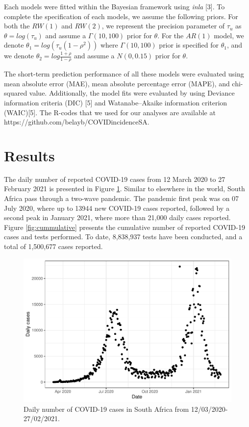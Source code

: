 \documentclass[10pt,letterpaper]{article}
\begin{document}
Each models were fitted within the Bayesian framework using
\emph{inla} {[}3{]}. To complete the specification of each models, we
assume the following priors. For both the \(RW(1)\) and \(RW(2)\), we represent the precision parameter of
\(\tau_u\) as \(\theta=log(\tau_u)\) and assume a
\(\Gamma (10,100)\) prior for \(\theta\).  For the \(AR(1)\) model, we denote
\(\theta_1=log(\tau_u(1-\rho^2))\) where \(\Gamma(10,100)\) prior is
specified for \(\theta_1\), and we denote
\(\theta_2=log\frac{1+\rho}{1-\rho}\) and assume a \(N(0, 0.15)\) prior
for \(\theta\). 

The short-term prediction performance of all these models were evaluated using mean absolute error (MAE), mean absolute percentage error (MAPE), and chi-squared value. Additionally, the model fits were evaluated by using Deviance information criteria (DIC) {[}5{]} and Watanabe–Akaike information criterion (WAIC){[}5{]}. The R-codes that we used for our analyses are available at
https://github.com/belayb/COVIDincidenceSA.



\hypertarget{results}{%
\section{Results}\label{results}}

The daily number of reported COVID-19 cases from 12
March 2020 to 27 February 2021 is presented in Figure \ref{fig:daily-cases}. Similar to elsewhere in the world, South
Africa pass through a two-wave pandemic. The pandemic first peak was
on 07 July 2020, where up to 13944 new COVID-19 cases reported, followed
by a second peak in January 2021, where more than 21,000 daily cases
reported. Figure \ref{fig:cummulative} presents the cumulative number of reported
COVID-19 cases and tests performed. To date, 8,838,937 tests have been
conducted, and a total of 1,500,677 cases reported.

\begin{figure}[H]
\includegraphics[width=0.99\linewidth]{COVIDincidenceSA_files/figure-latex/daily-cases-1} \caption{Daily number of COVID-19 cases in South Africa from 12/03/2020-27/02/2021.}\label{fig:daily-cases}
\end{figure}
\end{document}
